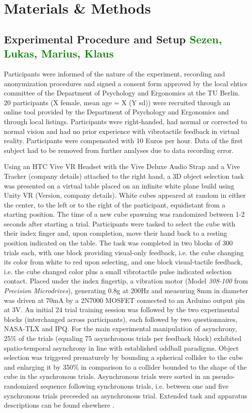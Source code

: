 \section{Materials \& Methods}
\subsection{Experimental Procedure and Setup \textcolor{green}{Sezen, Lukas, Marius, Klaus}}
Participants were informed of the nature of the experiment, recording and anonymization procedures and signed a consent form approved by the local ehtics committee of the Department of Psychology and Ergonomics at the TU Berlin. 20 participants (X female, mean age = X (Y sd)) were recruited through an online tool provided by the Department of Psychology and Ergonomics and through local listings. Participants were right-handed, had normal or corrected to normal vision and had no prior experience with vibrotactile feedback in virtual reality. Participants were compensated with 10 Euros per hour. Data of the first subject had to be removed from further analyses due to data recording error.

Using an HTC Vive VR Headset with the Vive Deluxe Audio Strap and a Vive Tracker (company details) attached to the right hand, a 3D object selection task was presented on a virtual table placed on an infinite white plane build using Unity VR (Version, company details). White cubes appeared at random in either the center, to the left or to the right of the participant, equidistant from a starting position. The time of a new cube spawning was randomized between 1-2 seconds after starting a trial. Participants were tasked to select the cube with their index finger and, upon completion, move their hand back to a resting position indicated on the table. The task was completed in two blocks of 300 trials each, with one block providing visual-only feedback, i.e. the cube changing its color from white to red upon selecting, and one block visual-tactile feedback, i.e. the cube changed color plus a small vibrotactile pulse indicated selection contact. Placed under the index fingertip, a vibration motor (Model \textit{308-100} from \textit{Precision Microdrives}), generating 0.8g at 200Hz and measuring 8mm in diameter was driven at 70mA by a 2N7000 MOSFET connected to an Arduino output pin at 3V. An initial 24 trial training session was followed by the two experimental blocks (interchanged across participants), each followed by two questionnaires, NASA-TLX and IPQ. For the main experimental manipulation of asynchrony, 25\% of the trials (equaling 75 asynchronous trials per feedback block) exhibited spatio-temporal asynchrony in line with established oddball paradigms. Object selection was triggered prematurely by bounding a spherical collider to the cube and enlarging it by 350\% in comparison to a collider bounded to the shape of the cube in the synchronous trials. Asynchronous trials were sorted in an pseudo-randomized sequence following synchronous trials, i.e. between one and five synchronous trials preceeded an asynchronous trial. Extended task and apparatus descriptions can be found elsewhere \cite{Gehrke_2019}.

